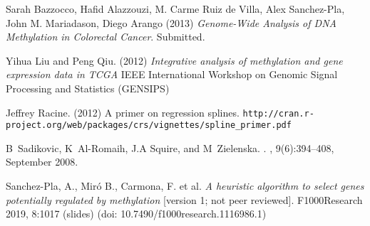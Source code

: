 \vspace{-5mm}
\begin{thebibliography}{9}
%




 Sarah Bazzocco, Hafid Alazzouzi, M. Carme Ruiz de Villa, Alex Sanchez-Pla, John M. Mariadason, Diego Arango (2013) \emph{Genome-Wide Analysis of DNA Methylation in Colorectal Cancer}. Submitted.

 Yihua Liu and Peng Qiu. (2012) \emph{Integrative analysis of methylation and gene expression data in TCGA} IEEE International Workshop on Genomic Signal Processing and Statistics (GENSIPS)

 Jeffrey Racine. (2012) A primer on regression splines.\newline
\verb|http://cran.r-project.org/web/packages/crs/vignettes/spline_primer.pdf|

B~Sadikovic, K~Al-Romaih, J.A Squire, and M~Zielenska.
.
, 9(6):394--408, September 2008.

Sanchez-Pla, A., Mir\'o B., Carmona, F. et al.  \emph{A heuristic algorithm to select genes potentially regulated by methylation} [version 1; not peer reviewed]. F1000Research 2019, 8:1017 (slides) (doi: 10.7490/f1000research.1116986.1)

\end{thebibliography}
